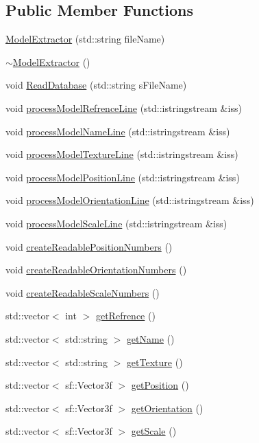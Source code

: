 \subsection*{Public Member Functions}
\begin{DoxyCompactItemize}
\item 
\hyperlink{class_model_extractor_a2347486e0a52e3458e9f3e65a120dec2}{Model\+Extractor} (std\+::string file\+Name)
\item 
\hyperlink{class_model_extractor_ab5ad796ee0213f2229bf2f5c6c8eb482}{$\sim$\+Model\+Extractor} ()
\item 
void \hyperlink{class_model_extractor_ab09dc19b136bd09661a4d7ff28fb03a7}{Read\+Database} (std\+::string s\+File\+Name)
\item 
void \hyperlink{class_model_extractor_a7eb2f5737963281bea5ed6ac5de072b0}{process\+Model\+Refrence\+Line} (std\+::istringstream \&iss)
\item 
void \hyperlink{class_model_extractor_af4c4726e7e474552958b4cb2b1f4142e}{process\+Model\+Name\+Line} (std\+::istringstream \&iss)
\item 
void \hyperlink{class_model_extractor_afe64d388bf8efc623af9570303b09ae0}{process\+Model\+Texture\+Line} (std\+::istringstream \&iss)
\item 
void \hyperlink{class_model_extractor_a75c1ea311dfa437712af661cb4943fb3}{process\+Model\+Position\+Line} (std\+::istringstream \&iss)
\item 
void \hyperlink{class_model_extractor_aa437809f62dc7a02b6fe843269d3b342}{process\+Model\+Orientation\+Line} (std\+::istringstream \&iss)
\item 
void \hyperlink{class_model_extractor_a7e66f0061b47a35d6708ee6b8092933c}{process\+Model\+Scale\+Line} (std\+::istringstream \&iss)
\item 
void \hyperlink{class_model_extractor_a0bdda45adf49226dec679b7e3c736478}{create\+Readable\+Position\+Numbers} ()
\item 
void \hyperlink{class_model_extractor_a5dec1fc4b5efefb78ceaec2d603b2081}{create\+Readable\+Orientation\+Numbers} ()
\item 
void \hyperlink{class_model_extractor_a55c88ca5985765592790a0b584426bd2}{create\+Readable\+Scale\+Numbers} ()
\item 
std\+::vector$<$ int $>$ \hyperlink{class_model_extractor_a705e7ffe3d8888c316f35431cb6c58a9}{get\+Refrence} ()
\item 
std\+::vector$<$ std\+::string $>$ \hyperlink{class_model_extractor_a1836d8eebb18bb6bcace2616e0aeb74f}{get\+Name} ()
\item 
std\+::vector$<$ std\+::string $>$ \hyperlink{class_model_extractor_ac925f4f4c80ec4739dcc2c306225519d}{get\+Texture} ()
\item 
std\+::vector$<$ sf\+::\+Vector3f $>$ \hyperlink{class_model_extractor_a9aef3acf4ca5d554649be296044b0c0d}{get\+Position} ()
\item 
std\+::vector$<$ sf\+::\+Vector3f $>$ \hyperlink{class_model_extractor_a2637fe0e4052ff38031a81dd2f00d1b9}{get\+Orientation} ()
\item 
std\+::vector$<$ sf\+::\+Vector3f $>$ \hyperlink{class_model_extractor_a5536264c569072b1cf854e092fd24f02}{get\+Scale} ()
\end{DoxyCompactItemize}
